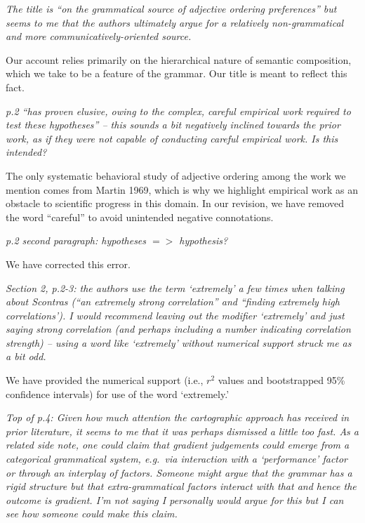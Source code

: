 \documentclass[12pt]{article}
\newcommand{\jd}[1]{\textcolor{red}{[jd: #1]}}
\begin{document}
\item \emph{The title is ``on the grammatical source of adjective ordering
preferences'' but seems to me that the authors ultimately argue for a
relatively non-grammatical and more communicatively-oriented source.}

Our account relies primarily on the hierarchical nature of semantic composition, which we take to be a feature of the grammar. Our title is meant to reflect this fact.

\item \emph{p.2 ``has proven elusive, owing to the complex, careful empirical work
required to test these hypotheses'' – this sounds a bit negatively
inclined towards the prior work, as if they were not capable of conducting
careful empirical work. Is this intended?}

The only systematic behavioral study of adjective ordering among the work we mention comes from Martin 1969, which is why we highlight empirical work as an obstacle to scientific progress in this domain. In our revision, we have removed the word ``careful'' to avoid unintended negative connotations. %

\item \emph{p.2 second paragraph: hypotheses $=>$ hypothesis?}

We have corrected this error.

\item \emph{Section 2, p.2-3: the authors use the term `extremely' a few times when talking about Scontras (``an extremely strong correlation'' and ``finding
extremely high correlations').  I would recommend leaving out the modifier
`extremely' and just saying strong correlation (and perhaps including a
number indicating correlation strength) – using a word like
`extremely' without numerical support struck me as a bit odd.}

We have provided the numerical support (i.e., $r^2$ values and bootstrapped 95\% confidence intervals) for use of the word `extremely.'

\item \emph{Top of p.4: Given how much attention the cartographic approach has received in prior literature, it seems to me that it was perhaps dismissed a little too fast. As a related side note, one could claim that gradient judgements
could emerge from a categorical grammatical system, e.g.~via interaction with
a `performance' factor or through an interplay of factors. Someone might
argue that the grammar has a rigid structure but that extra-grammatical
factors interact with that and hence the outcome is gradient. I'm not
saying I personally would argue for this but I can see how someone could
make this claim.}
\end{document}
